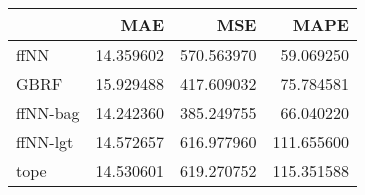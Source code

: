 \begin{tabular}{lrrr}
\toprule
{} &        MAE &         MSE &        MAPE \\
\midrule
ffNN     &  14.359602 &  570.563970 &   59.069250 \\
GBRF     &  15.929488 &  417.609032 &   75.784581 \\
ffNN-bag &  14.242360 &  385.249755 &   66.040220 \\
ffNN-lgt &  14.572657 &  616.977960 &  111.655600 \\
tope     &  14.530601 &  619.270752 &  115.351588 \\
\bottomrule
\end{tabular}
